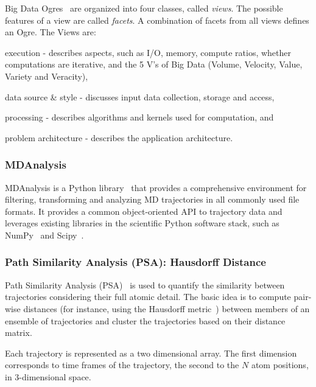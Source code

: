 Big Data Ogres~\cite{fox2014towards} are organized into four classes, called \emph{views}. 
The possible features of a view are called \emph{facets}.
A combination of facets from all views defines an Ogre.
The Views are: 
\begin{inparaenum}[1)]
    \item execution - describes aspects, such as I/O, memory, compute ratios, whether computations are iterative, and the 5 V's of Big Data (Volume, Velocity, Value, Variety and Veracity),
    \item data source \& style - discusses input data collection, storage and access,
    \item processing - describes algorithms and kernels used for computation, and
    \item problem architecture - describes the application architecture.
\end{inparaenum}


\subsubsection{MDAnalysis}
\label{sec:mda}
MDAnalysis is a Python library~\cite{michaud2011mdanalysis,gowers2016mdanalysis} that provides a comprehensive environment for filtering, transforming and analyzing MD trajectories in all commonly used file formats.
It provides a common object-oriented API to trajectory data and leverages existing libraries in the scientific Python software stack, such as NumPy~\cite{numpy} and Scipy~\cite{scipy}.

\subsubsection*{Path Similarity Analysis (PSA): Hausdorff Distance}Path Similarity Analysis (PSA)~\cite{seyler2015path} is used to quantify the similarity between trajectories considering their full atomic detail.
The basic idea is to compute pair-wise distances (for instance, using the Hausdorff metric~\cite{huttenlocher1993comparing}) between members of an ensemble of trajectories and cluster the trajectories based on their distance matrix.

Each trajectory is represented as a two dimensional array.
The first dimension corresponds to time frames of the trajectory, the second to the $N$ atom positions, in 3-dimensional space.

